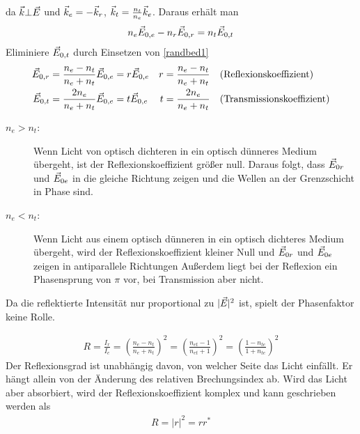 da $\vec{k}\bot\vec{E}$ und $\vec{k}_e = -\vec{k}_r$, 
$\vec{k}_t = \frac{n_t}{n_e}\vec{k}_e$. Daraus erhält man
\begin{gather*}
  n_e\vec{E}_{0,e} -   n_r\vec{E}_{0,r} =   n_t\vec{E}_{0,t}
\end{gather*}
Eliminiere $\vec{E}_{0,t}$ durch Einsetzen von \eqref{randbed1}
\begin{align*}
  \vec{E}_{0,r} &= \frac{n_e-n_t}{n_e+n_t} \vec{E}_{0,e} = r\vec{E}_{0,e}
  &r &= \frac{n_e-n_t}{n_e+n_t} 
  &&\text{(Reflexionskoeffizient)}\\
  \vec{E}_{0,t} &= \frac{2n_e}{n_e+n_t} \vec{E}_{0,e} = t\vec{E}_{0,e}
  &t &= \frac{2n_e}{n_e+n_t} 
  &&\text{(Transmissionskoeffizient)}
\end{align*}%
%
%
%
%


\begin{description}
\item[$n_e>n_t$:] Wenn Licht von optisch dichteren in ein optisch dünneres
  Medium übergeht, ist der Reflexionskoeffizient größer null. 
  Daraus folgt, dass $\vec{E}_{0r}$ und $\vec{E}_{0e}$ in die gleiche
  Richtung zeigen und die Wellen an der Grenzschicht in Phase sind. 
\item[$n_e<n_t$:] Wenn Licht aus einem optisch dünneren in ein optisch dichteres
  Medium übergeht, wird der Reflexionskoeffizient kleiner Null und
  $\vec{E}_{0r}$ und $\vec{E}_{0e}$ zeigen in antiparallele Richtungen
  Außerdem liegt bei der Reflexion ein Phasensprung von $\pi$ vor,
  bei Transmission aber nicht.
\end{description}
Da die reflektierte Intensität nur proportional zu
$|\vec{E}|^2$ ist, spielt der Phasenfaktor keine Rolle.

\begin{gather*}
  R = \frac{I_r}{I_e}
  =\left( \frac{n_e-n_t}{n_e+n_t} \right)^2
  =\left( \frac{n_{et}-1}{n_{et}+1} \right)^2
  =\left( \frac{1-n_{te}}{1+n_{te}} \right)^2
\end{gather*}
Der Reflexionsgrad ist unabhängig davon, von welcher Seite das Licht
einfällt. Er hängt allein von der Änderung des relativen
Brechungsindex ab. Wird das Licht aber absorbiert, wird der
Reflexionskoeffizient komplex und kann geschrieben werden als
\begin{align*}
  R=\vert r\vert^2=rr^*
\end{align*}
